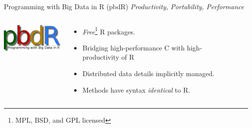 \begin{frame}
  \begin{block}{Programming with Big Data in R (pbdR)}
       \centering \emph{Productivity, Portability, Performance}\\[.4cm]
  \begin{columns}[onlytextwidth]
    \begin{column}{0.30\textwidth}
      \centering
       \includegraphics[width=3.4cm]{pics/simple}\\[.2cm]
    \end{column}
    \begin{column}{0.65\textwidth}
  \begin{itemize}
    \item \emph{Free}\footnote{MPL, BSD, and GPL licensed} R packages.
    \item Bridging high-performance C with high-productivity of R
    \item Distributed data details implicitly managed.
    \item Methods have syntax \emph{identical} to R.
  \end{itemize}
    \end{column}
​  \end{columns}
\end{block}
\end{frame}



